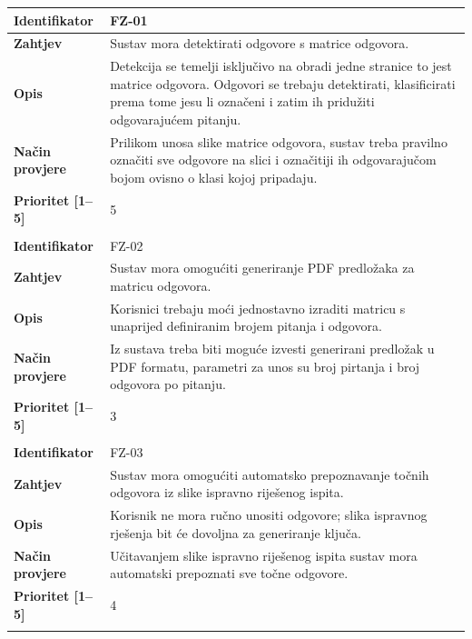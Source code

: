 \documentclass{foi}
\begin{document}
\begin{longtable}{|l|p{12cm}|}
    \hline
    \textbf{Identifikator} & FZ-01 \\ \hline
    \textbf{Zahtjev} & Sustav mora detektirati odgovore s matrice odgovora. \\ \hline
    \textbf{Opis} & Detekcija se temelji isključivo na obradi jedne stranice to jest matrice odgovora. Odgovori se trebaju detektirati, klasificirati prema tome jesu li označeni i zatim ih pridužiti odgovarajućem pitanju.\\ \hline
    \textbf{Način provjere} & Prilikom unosa slike matrice odgovora, sustav treba pravilno označiti sve odgovore na slici i označitiji ih odgovarajučom bojom ovisno o klasi kojoj pripadaju. \\ \hline
    \textbf{Prioritet [1--5]} & 5 \\ \hline
    \multicolumn{2}{|c|}{} \\ \hline
    
    \textbf{Identifikator} & FZ-02 \\ \hline
    \textbf{Zahtjev} & Sustav mora omogućiti generiranje PDF predložaka za matricu odgovora. \\ \hline
    \textbf{Opis} & Korisnici trebaju moći jednostavno izraditi matricu s unaprijed definiranim brojem pitanja i odgovora. \\ \hline
    \textbf{Način provjere} & Iz sustava treba biti moguće izvesti generirani predložak u PDF formatu, parametri za unos su broj pirtanja i broj odgovora po pitanju. \\ \hline
    \textbf{Prioritet [1--5]} & 3 \\ \hline
    \multicolumn{2}{|c|}{} \\ \hline
    
    \textbf{Identifikator} & FZ-03 \\ \hline
    \textbf{Zahtjev} & Sustav mora omogućiti automatsko prepoznavanje točnih odgovora iz slike ispravno riješenog ispita. \\ \hline
    \textbf{Opis} & Korisnik ne mora ručno unositi odgovore; slika ispravnog rješenja bit će dovoljna za generiranje ključa. \\ \hline
    \textbf{Način provjere} & Učitavanjem slike ispravno riješenog ispita sustav mora automatski prepoznati sve točne odgovore. \\ \hline
    \textbf{Prioritet [1--5]} & 4 \\ \hline
    \multicolumn{2}{|c|}{} \\ \hline
    

\end{longtable}
\end{document}

